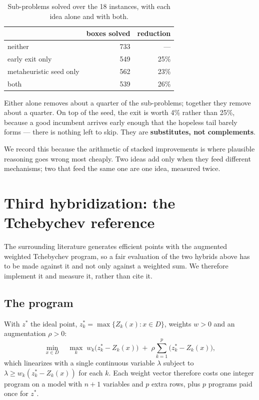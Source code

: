 \documentclass[11pt,a4paper]{article}
\newcommand{\Z}{Z}
\newcommand{\Dset}{D}
\begin{document}
\begin{table}[h]
\centering
\caption{Sub-problems solved over the 18 instances, with each idea alone and
with both.}
\begin{tabular}{lrr}
\toprule
 & boxes solved & reduction \\
\midrule
neither                      & 733 & --- \\
early exit only              & 549 & 25\% \\
metaheuristic seed only      & 562 & 23\% \\
both                         & 539 & 26\% \\
\bottomrule
\end{tabular}
\end{table}

\noindent
Either alone removes about a quarter of the sub-problems; together they remove
about a quarter. On top of the seed, the exit is worth 4\% rather than 25\%,
because a good incumbent arrives early enough that the hopeless tail barely
forms --- there is nothing left to skip. They are \textbf{substitutes, not
complements}.

We record this because the arithmetic of stacked improvements is where
plausible reasoning goes wrong most cheaply. Two ideas add only when they feed
different mechanisms; two that feed the same one are one idea, measured twice.

\section{Third hybridization: the Tchebychev reference}\label{sec:tcheb}

The surrounding literature generates efficient points with the augmented
weighted Tchebychev program, so a fair evaluation of the two hybrids above has
to be made against it and not only against a weighted sum. We therefore
implement it and measure it, rather than cite it.

\subsection{The program}

With $z^{*}$ the ideal point, $z^{*}_k = \max\{\Z_k(x) : x \in \Dset\}$,
weights $w > 0$ and an augmentation $\rho > 0$:
\begin{equation}\label{eq:tcheb}
  \min_{x \in \Dset} \quad \max_{k} \; w_k\bigl(z^{*}_k - \Z_k(x)\bigr)
  \;+\; \rho \sum_{k=1}^{p} \bigl(z^{*}_k - \Z_k(x)\bigr),
\end{equation}
which linearizes with a single continuous variable $\lambda$ subject to
$\lambda \geqslant w_k (z^{*}_k - \Z_k(x))$ for each $k$. Each weight vector
therefore costs one integer program on a model with $n+1$ variables and $p$
extra rows, plus $p$ programs paid once for $z^{*}$.
\end{document}

